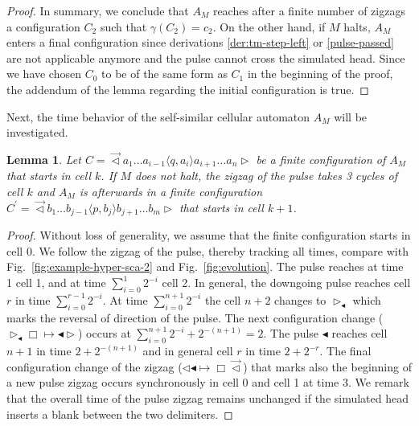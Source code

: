 \documentclass[pre,showpacs,showkeys,preprint]{revtex4}
\newtheorem{lemma}{Lemma}
\theoremstyle{definition}
\begin{document}
\begin{proof}
In summary, we conclude that $A_M$ reaches after a finite number of zigzags a configuration $C_2$ such that
$\gamma(C_2) = c_2$.
On the other hand, if $M$ halts, $A_M$ enters a final configuration since derivations
\ref{der:tm-step-left} or \ref{pulse-passed} are not applicable anymore
and the pulse cannot cross the simulated head.
Since we have chosen $C_0$ to be of the same form
as $C_1$ in the beginning of the proof, the addendum of the lemma regarding the initial configuration is true.
\end{proof}

Next, the time behavior of the self-similar cellular automaton $A_M$ will be investigated.
\begin{lemma}
Let $C=\overrightarrow{\lhd}  a_1 \ldots a_{i-1} \langle q,a_i \rangle a_{i+1} \ldots a_n \rhd$
be a finite configuration of $A_M$ that starts in cell $k$.
If $M$ does not halt, the zigzag of the pulse takes 3 cycles of cell $k$ and $A_M$
is afterwards in a finite configuration
$C^\prime=\overrightarrow{\lhd}  b_1 \ldots b_{j-1} \langle p,b_j \rangle b_{j+1} \ldots b_m \rhd$
that starts in cell $k + 1$.
\end{lemma}
\begin{proof}
Without loss of generality, we assume that the finite configuration starts in cell 0.
We follow the zigzag of the pulse, thereby tracking all times,
compare with Fig.~\ref{fig:example-hyper-sca-2} and Fig.~\ref{fig:evolution}.
The pulse reaches at time 1 cell 1,
and at time $\sum_{i=0}^1 2^{-i}$ cell 2.
In general, the downgoing pulse reaches cell $r$ in time $\sum_{i=0}^{r-1} 2^{-i}$.
At time $\sum_{i=0}^{n+1} 2^{-i}$ the cell $n+2$ changes to $\rhd_\blacktriangleleft$
which marks the reversal of direction of the pulse.
The next configuration change ($\rhd_\blacktriangleleft \Box \mapsto \blacktriangleleft \rhd$)
occurs at $\sum_{i=0}^{n+1} 2^{-i} + 2^{-(n+1)} = 2$.
The pulse $\blacktriangleleft$ reaches cell $n+1$ in time $2 + 2^{-(n+1)}$ and in general
cell $r$ in time $2 + 2^{-r}$.
The final configuration change of the zigzag ($\lhd  \blacktriangleleft \mapsto \Box  \overrightarrow{\lhd}$)
that marks also the beginning of a new pulse zigzag occurs synchronously in cell 0 and cell 1 at time 3.
We remark that the overall time of the pulse zigzag remains unchanged if the
simulated head inserts a blank between the two delimiters.
\end{proof}
\end{document}
